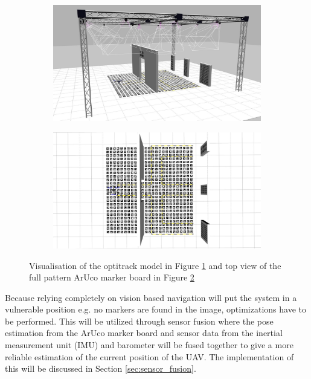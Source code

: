 \documentclass[../Head/report.tex]{subfiles}
\begin{document}
\begin{figure}[H]
    \centering
    \begin{subfigure}[t]{.48\textwidth}
        \centering
        \includegraphics[width=\textwidth]{../Figures//3d-modeling/gazebo_full_pattern_view.jpg}
        \caption{}
        \label{fig:optitrack_full_pattern_aruco}
    \end{subfigure}
    \hfill
    \begin{subfigure}[t]{.48\textwidth}
        \centering
        \includegraphics[width=\textwidth]{../Figures/3d-modeling/gazebo_full_pattern.jpg}
        \caption{}
        \label{fig:full_pattern_aruco}
    \end{subfigure}
    \caption{Visualisation of the optitrack model in Figure \ref{fig:optitrack_full_pattern_aruco} and top view of the full pattern ArUco marker board in Figure \ref{fig:full_pattern_aruco}}
    \label{fig:full_pattern_aruco_fig}
\end{figure}

Because relying completely on vision based navigation will put the system in a vulnerable position e.g. no markers are found in the image, optimizations have to be performed. This will be utilized through sensor fusion where the pose estimation from the ArUco marker board and sensor data from the inertial measurement unit (IMU) and barometer will be fused together to give a more reliable estimation of the current position of the UAV. The implementation of this will be discussed in Section \ref{sec:sensor_fusion}. 
\end{document}

